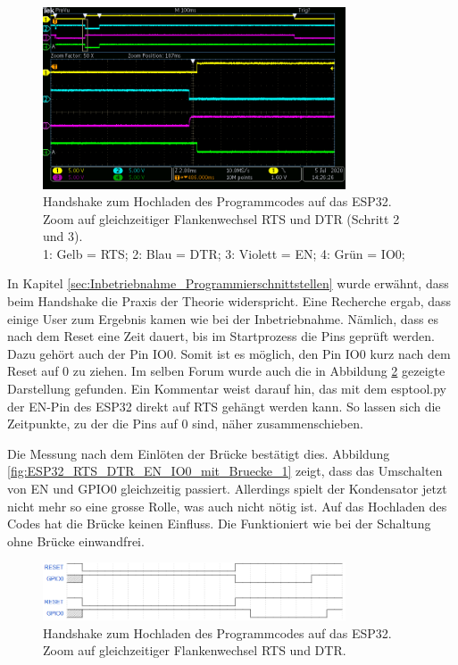 \begin{figure}[H]
\center
\includegraphics[width = 0.8\textwidth]{graphics/ESP32_RTS_DTR_EN_IO0_2}
\caption{Handshake zum Hochladen des Programmcodes auf das ESP32. Zoom auf gleichzeitiger Flankenwechsel RTS und DTR (Schritt 2 und 3).\\\hspace{\textwidth}1: Gelb = RTS; 2: Blau = DTR; 3: Violett = EN; 4: Grün = IO0;}
\label{fig:ESP32_RTS_DTR_EN_IO0_2}
\end{figure}


In Kapitel \ref{sec:Inbetriebnahme_Programmierschnittstellen} wurde erwähnt, dass beim Handshake die Praxis der Theorie widerspricht. Eine Recherche ergab, dass einige User zum Ergebnis kamen wie bei der Inbetriebnahme. Nämlich, dass es nach dem Reset eine Zeit dauert, bis im Startprozess die Pins geprüft werden. Dazu gehört auch der Pin IO0. Somit ist es möglich, den Pin IO0 kurz nach dem Reset auf 0 zu ziehen.
Im selben Forum wurde auch die in Abbildung \ref{fig:ESP32_Handshake_Forum} gezeigte Darstellung gefunden. Ein Kommentar weist darauf hin, das mit dem esptool.py der EN-Pin des ESP32 direkt auf RTS gehängt werden kann. So lassen sich die Zeitpunkte, zu der die Pins auf 0 sind, näher zusammenschieben. \cite{liudr_trying_2017}

Die Messung nach dem Einlöten der Brücke bestätigt dies. Abbildung \ref{fig:ESP32_RTS_DTR_EN_IO0_mit_Bruecke_1} zeigt, dass das Umschalten von EN und GPIO0 gleichzeitig passiert. Allerdings spielt der Kondensator jetzt nicht mehr so eine grosse Rolle, was auch nicht nötig ist. Auf das Hochladen des Codes hat die Brücke keinen Einfluss. Die Funktioniert wie bei der Schaltung ohne Brücke einwandfrei.


\begin{figure}[H]
\center
\includegraphics[width = 0.8\textwidth]{graphics/ESP32_Handshake_Forum}
\caption{Handshake zum Hochladen des Programmcodes auf das ESP32. Zoom auf gleichzeitiger Flankenwechsel RTS und DTR. \cite{liudr_trying_2017}}
\label{fig:ESP32_Handshake_Forum}
\end{figure}

